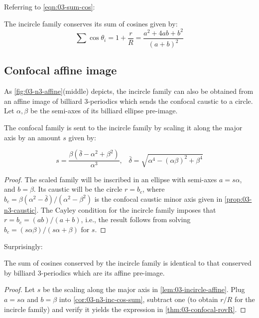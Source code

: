 Referring to \cref{eqn:03-sum-cos}: 

\begin{corollary}
The incircle family conserves its sum of cosines given by:
\[ \sum{\cos\theta_i}=1+\frac{r}{R}=\frac{{a}^2+4 {a}
   {b}+{b}^2}{({a}+{b})^2}\]
\label{cor:03-n3-inc-cos-sum}
\end{corollary}

\subsection{Confocal affine image} As \cref{fig:03-n3-affine}(middle) depicts, the incircle family can also be obtained from an affine image of billiard 3-periodics which sends the confocal caustic to a circle. Let $\alpha,\beta$ be the semi-axes of its billiard ellipse pre-image.

\begin{lemma}
The confocal family is sent to the incircle family by scaling it along the major axis by an amount $s$ given by:

\[ s=\frac{\beta (\bar{\delta}-\alpha^2+\beta^2)}{\alpha^3},\;\;\; \bar{\delta}=\sqrt{\alpha^4-(\alpha \beta)^2+\beta^4}\]

\label{lem:03-incircle-affine}
\end{lemma}

\begin{proof}
The scaled family will be inscribed in an ellipse with semi-axes $a = s \alpha$, and $b =\beta$. Its caustic will be the circle $r=b_c$, where $b_c={\beta\left({\alpha}^{2}-\bar{\delta}\right)}/(\alpha^2-\beta^2)$ is the confocal caustic minor axis given in \cref{prop:03-n3-caustic}. The Cayley condition for the incircle family imposes that $r=b_c=(a b)/(a + b)$, i.e., the result follows from solving $b_c = (s \alpha \beta)/(s \alpha + \beta)$ for $s$.

\end{proof}

\noindent Surprisingly:

\begin{proposition}
The sum of cosines conserved by the incircle family is identical to that conserved by billiard 3-periodics which are its affine pre-image.
\label{prop:03-incircle-same-sum-cos}
\end{proposition}

\begin{proof}
Let $s$ be the scaling along the major axis in \cref{lem:03-incircle-affine}. Plug $a=s \alpha$ and $b=\beta$ into  \cref{cor:03-n3-inc-cos-sum}, subtract one (to obtain $r/R$ for the incircle family) and verify it yields the expression in \cref{thm:03-confocal-rovR}.
\end{proof}

